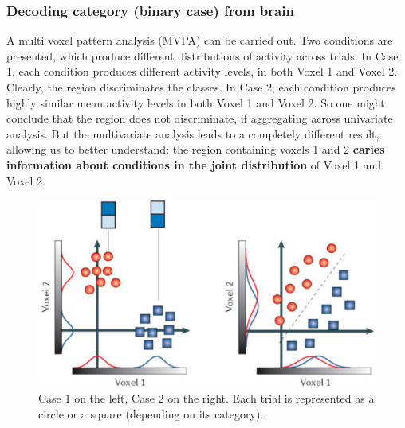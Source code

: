 \subsubsection{Decoding category (binary case) from brain}
A multi voxel pattern analysis (MVPA) can be carried out.
Two conditions are presented, which produce different distributions of activity across trials. In Case 1, each condition produces different activity levels, in both Voxel 1 and Voxel 2. Clearly, the region discriminates the classes.
In Case 2, each condition produces highly similar mean activity levels in both Voxel 1 and Voxel 2. So one might conclude that the region does not discriminate, if aggregating across univariate analysis.
But the multivariate analysis leads to a completely different result, allowing us to better understand: the region containing voxels 1 and 2 \textbf{caries information about conditions in the joint distribution} of Voxel 1 and Voxel 2.
\begin{figure}[!ht]
    \centering
    \captionsetup{width=.8\linewidth}
    \includegraphics[width=0.5\linewidth]{images/mvpa.png}
    \caption{Case 1 on the left, Case 2 on the right. Each trial is represented as a circle or a square (depending on its category).}
    \label{fig:multivariate}
\end{figure}
